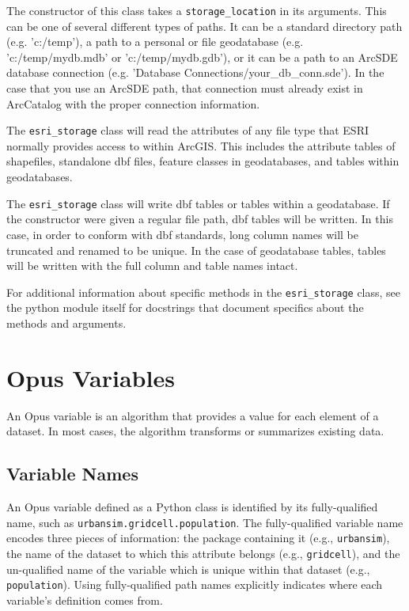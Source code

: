 The constructor of this class takes a \verb|storage_location| in its arguments.  This
can be one of several different types of paths.  It can be a standard directory path (e.g. 
'c:/temp'), a path to a personal or file geodatabase (e.g. 'c:/temp/mydb.mdb' or 'c:/temp/mydb.gdb'), or
it can be a path to an ArcSDE database connection (e.g. 'Database Connections/your_db_conn.sde').
In the case that you use an ArcSDE path, that connection must already exist in ArcCatalog with the 
proper connection information.

The \verb|esri_storage| class will read the attributes of any file type that ESRI normally provides 
access to within ArcGIS.  This includes the attribute tables of shapefiles, standalone
dbf files, feature classes in geodatabases, and tables within geodatabases.

The \verb|esri_storage| class will write dbf tables or tables within a geodatabase.  If the 
constructor were given a regular file path, dbf tables will be written.  In this case, in order 
to conform with dbf standards, long column names will be truncated and renamed to be unique.  In the 
case of geodatabase tables, tables will be written with the full column and table names intact.

For additional information about specific methods in the \verb|esri_storage| class, see the python 
module itself for docstrings that document specifics about the methods and arguments.

\section{Opus Variables} 
\label{sec:opus-variable}


An Opus variable is an algorithm that provides a value for
each element of a dataset. In most cases, the algorithm
transforms or summarizes existing data.

\subsection{Variable Names}
\label{sec:variable-names}


An Opus variable defined as a Python class is identified by its
fully-qualified name, such as \verb|urbansim.gridcell.population|.  The
fully-qualified variable name encodes three pieces of
information: the package containing it (e.g., \verb|urbansim|), the name of
the dataset to which this attribute belongs
(e.g., \verb|gridcell|), and the un-qualified name of the variable
 which is unique within that dataset (e.g.,
\verb|population|).  Using fully-qualified path names explicitly indicates where
each variable's definition comes from.

